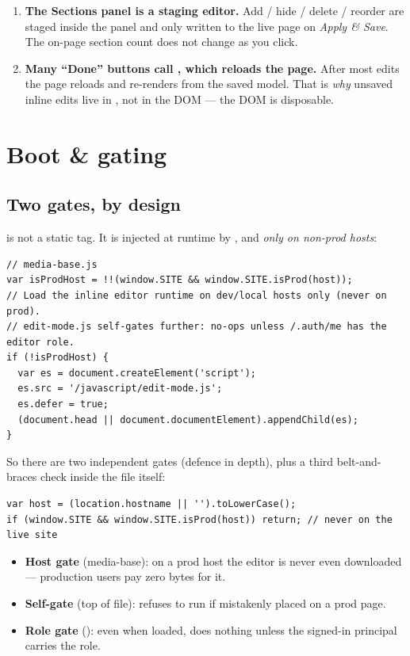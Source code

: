 \documentclass[11pt]{article}
\begin{document}
\begin{enumerate}[leftmargin=1.5em]
  \item \textbf{The Sections panel is a staging editor.} Add / hide / delete /
  reorder are staged inside the panel and only written to the live page on
  \emph{Apply \& Save}. The on-page section count does not change as you click.
  \item \textbf{Many ``Done'' buttons call , which reloads the
  page.} After most edits the page reloads and re-renders from the saved model.
  That is \emph{why} unsaved inline edits live in , not in the
  DOM --- the DOM is disposable.
\end{enumerate}

\section{Boot \& gating}

\subsection{Two gates, by design}

 is not a static  tag. It is injected at
runtime by , and \emph{only on non-prod hosts}:

\begin{lstlisting}
// media-base.js
var isProdHost = !!(window.SITE && window.SITE.isProd(host));
// Load the inline editor runtime on dev/local hosts only (never on prod).
// edit-mode.js self-gates further: no-ops unless /.auth/me has the editor role.
if (!isProdHost) {
  var es = document.createElement('script');
  es.src = '/javascript/edit-mode.js';
  es.defer = true;
  (document.head || document.documentElement).appendChild(es);
}
\end{lstlisting}

So there are two independent gates (defence in depth), plus a third belt-and-braces
check inside the file itself:

\begin{lstlisting}
var host = (location.hostname || '').toLowerCase();
if (window.SITE && window.SITE.isProd(host)) return; // never on the live site
\end{lstlisting}

\begin{itemize}[leftmargin=1.5em]
  \item \textbf{Host gate} (media-base): on a prod host the editor is never even
  downloaded --- production users pay zero bytes for it.
  \item \textbf{Self-gate} (top of file): refuses to run if mistakenly placed on a
  prod page.
  \item \textbf{Role gate} (): even when loaded, does nothing unless
  the signed-in principal carries the  role.
\end{itemize}
\end{document}
